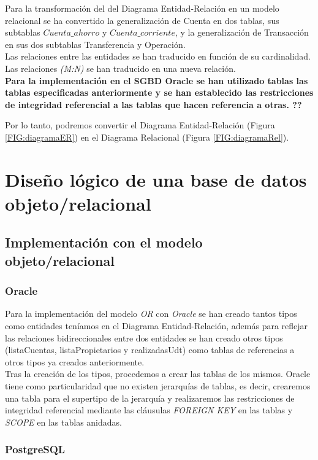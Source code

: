 \documentclass{article}
\begin{document}
Para la transformación del del Diagrama Entidad-Relación en un modelo relacional se ha convertido la generalización de Cuenta en dos tablas, sus subtablas $Cuenta\_ahorro$ y $Cuenta\_corriente$, y la generalización de Transacción en sus dos subtablas Transferencia y Operación.\\

Las relaciones entre las entidades se han traducido en función de su cardinalidad. Las relaciones \emph{(M:N)} se han traducido en una nueva relación.\\

\textbf{Para la implementación en el SGBD Oracle se han utilizado tablas las tablas especificadas anteriormente y se han establecido las restricciones de integridad referencial a las tablas que hacen referencia a otras. ??}

Por lo tanto, podremos convertir el Diagrama Entidad-Relación (Figura \ref{FIG:diagramaER}) en el Diagrama Relacional (Figura \ref{FIG:diagramaRel}).

\section{Diseño lógico de una base de datos objeto/relacional}
\subsection{Implementación con el modelo objeto/relacional}
\subsubsection{Oracle}
Para la implementación del modelo \emph{OR} con \emph{Oracle} se han creado tantos tipos como entidades teníamos en el Diagrama Entidad-Relación, además para reflejar las relaciones bidireccionales entre dos entidades se han creado otros tipos (listaCuentas, listaPropietarios y realizadasUdt) como tablas de referencias a otros tipos ya creados anteriormente.
\\
Tras la creación de los tipos, procedemos a crear las tablas de los mismos. Oracle tiene como particularidad que no existen jerarquías de tablas, es decir, crearemos una tabla para el supertipo de la jerarquía y realizaremos las restricciones de integridad referencial mediante las cláusulas \emph{FOREIGN KEY} en las tablas y \emph{SCOPE} en las tablas anidadas.
\\

\subsubsection{PostgreSQL}
\end{document}
